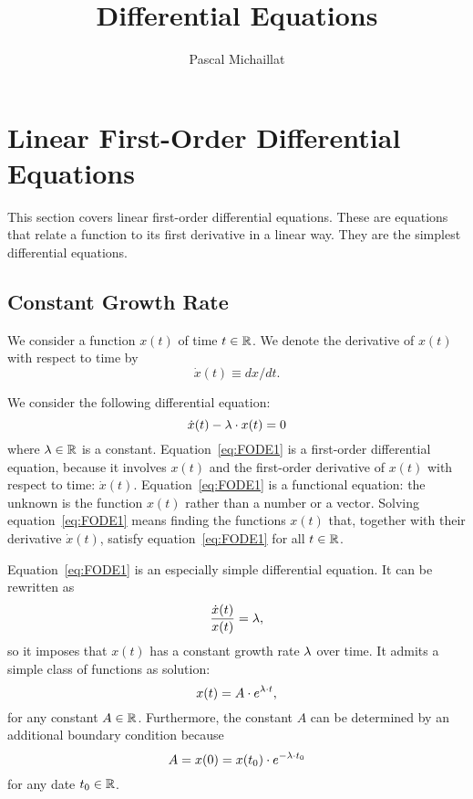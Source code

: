 \documentclass[letterpaper,12pt,leqno]{article}
\begin{document}
\title{Differential Equations}
\author{Pascal Michaillat}
\date{}

\begin{titlepage}
\maketitle
\tableofcontents
\end{titlepage}

\section{Linear First-Order Differential Equations}\label{sec:one}

This section covers linear first-order differential equations. These are equations that relate a function to its first derivative in a linear way. They are the simplest differential equations.

\subsection{Constant Growth Rate}

We consider a function $x(t)$ of time $t\in\mathbb{R}$. We denote the derivative of $x(t)$ with respect to time by \[\dot{x}(t)\equiv dx/dt.\] 

We consider the following differential equation:
\begin{equation}
\dot{x}(t) -\lambda\cdot x(t) = 0
\label{eq:FODE1}\end{equation}
where $\lambda\in\mathbb{R}$ is a constant. Equation~\eqref{eq:FODE1} is a first-order differential equation, because it involves $x(t)$ and the first-order derivative of $x(t)$ with respect to time: $\dot{x}(t)$.  Equation~\eqref{eq:FODE1} is a functional equation: the unknown is the function $x(t)$ rather than a number or a vector. Solving equation~\eqref{eq:FODE1} means finding the functions $x(t)$ that, together with their derivative $\dot{x}(t)$, satisfy equation~\eqref{eq:FODE1} for all $t \in \mathbb{R}$.

Equation~\eqref{eq:FODE1} is an especially simple differential equation. It can be rewritten as 
\[\frac{\dot{x}(t)}{x(t)}= \lambda,\]
so it imposes that $x(t)$ has a constant growth rate $\lambda$ over time. It admits a simple class of functions as solution:
\begin{equation}
x(t) =A\cdot  e^{\lambda \cdot t} \label{eq:FODE1sol},
\end{equation}
for any constant $A\in \mathbb{R}$. Furthermore, the constant $A$ can be determined by an additional boundary condition because
\[A=x(0)=x(t_{0})\cdot e^{-\lambda \cdot t_{0}}\]
for any date $t_{0}\in \mathbb{R}$.
\end{document}
